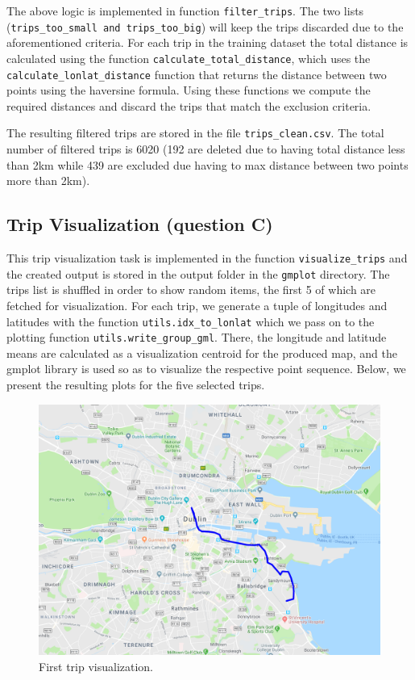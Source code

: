\documentclass[12pt]{article}
\begin{document}
	The above logic is implemented in function \texttt{filter\_trips}. The two
  lists (\texttt{trips\_too\_small and trips\_too\_big}) will keep the trips
  discarded due to the aforementioned criteria. For each trip in the training
  dataset the total distance is calculated using the function
  \texttt{calculate\_total\_distance}, which uses the
  \texttt{calculate\_lonlat\_distance} function that returns the distance
  between two points using the haversine formula. Using these functions we
  compute the required distances and discard the trips that match the exclusion
  criteria.
	
	The resulting filtered trips are stored in the file \texttt{trips\_clean.csv}. The total number of filtered trips is 6020 (192 are deleted due to having total distance less than 2km while 439 are excluded due having to max distance between two points more than 2km).
	
	\subsection{Trip Visualization (question C)}
	This trip visualization task is implemented in the function
  \texttt{visualize\_trips} and the created output is stored in the output
  folder in the \texttt{gmplot} directory. The trips list is shuffled in order
  to show random items, the first 5 of which are fetched for
  visualization. For each trip, we generate a tuple of longitudes and latitudes
  with the function \texttt{utils.idx\_to\_lonlat} which we pass on to the
  plotting function \texttt{utils.write\_group\_gml}. There, the longitude and
  latitude means are calculated as a visualization centroid for the produced map, and the gmplot
  library is used so as to visualize the respective point sequence. Below, we present the resulting plots for the five selected trips.
	
	\begin{figure} [H]
		\begin{center}
			\includegraphics [scale = 0.55] {questionC1.png}
			\caption{First trip visualization.}
		\end{center}
    \label{gmlplot_example}
	\end{figure}
\end{document}
